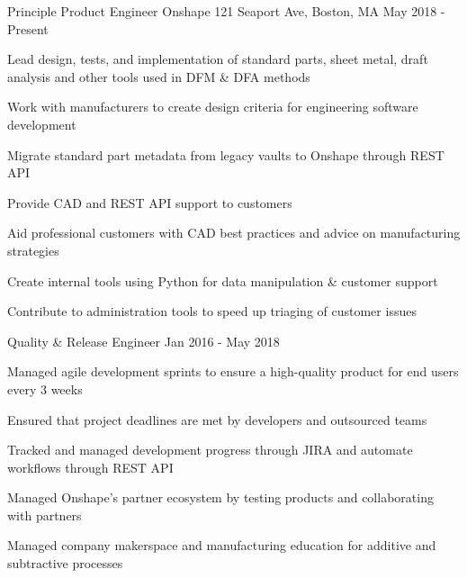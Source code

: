 

\begin{cventries}

  \cventry
    {Principle Product Engineer} %
    {Onshape} %
    {121 Seaport Ave, Boston, MA} %
    {May 2018 - Present} %
    {
      \begin{cvitems} %
        \item {Lead design, tests, and implementation of standard parts, sheet metal, draft analysis and other tools used in DFM \& DFA methods}
        \item {Work with manufacturers to create design criteria for engineering software development}
        \item {Migrate standard part metadata from legacy vaults to Onshape through REST API}
        \item {Provide CAD and REST API support to customers}
        \item {Aid professional customers with CAD best practices and advice on manufacturing strategies}
        \item {Create internal tools using Python for data manipulation \& customer support}
        \item {Contribute to administration tools to speed up triaging of customer issues}
      \end{cvitems}
    }

  \cventry
    {Quality \& Release Engineer} %
    {} %
    {} %
    {Jan 2016 - May 2018} %
    {
      \begin{cvitems} %
        \item {Managed agile development sprints to ensure a high-quality product for end users every 3 weeks}
        \item {Ensured that project deadlines are met by developers and outsourced teams}
        \item {Tracked and managed development progress through JIRA and automate workflows through REST API}
        \item {Managed Onshape’s partner ecosystem by testing products and collaborating with partners}
        \item {Managed company makerspace and manufacturing education for additive and subtractive processes} 
      \end{cvitems}
    }


\end{cventries}
